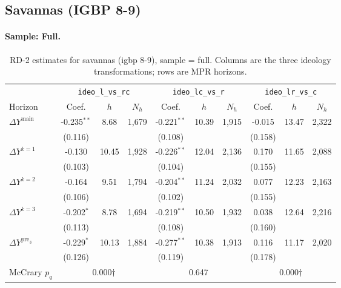 \documentclass[11pt]{article}
\begin{document}
\clearpage
\subsection{Savannas (IGBP 8-9)}
\paragraph{Sample: Full.}
\begin{table}[H]
\centering
\scriptsize
\caption{RD-2 estimates for savannas (igbp 8-9), sample = full.
Columns are the three ideology transformations; rows are MPR horizons.}
\label{tab:rd2_savannas_all}
\begin{tabular}{l ccc ccc ccc}
\toprule
 & \multicolumn{3}{c}{\texttt{ideo\_l\_vs\_rc}}
 & \multicolumn{3}{c}{\texttt{ideo\_lc\_vs\_r}}
 & \multicolumn{3}{c}{\texttt{ideo\_lr\_vs\_c}} \\
\cmidrule(lr){2-4} \cmidrule(lr){5-7} \cmidrule(lr){8-10}
Horizon & Coef. & $h$ & $N_h$ & Coef. & $h$ & $N_h$ & Coef. & $h$ & $N_h$ \\
\midrule
$\Delta Y^{\text{main}}$ & -0.235$^{**}$ & 8.68 & 1,679 & -0.221$^{**}$ & 10.39 & 1,915 & -0.015 & 13.47 & 2,322 \\
 & (0.116) &  &  & (0.108) &  &  & (0.158) &  &  \\
\addlinespace[1pt]
$\Delta Y^{k=1}$ & -0.130 & 10.45 & 1,928 & -0.226$^{**}$ & 12.04 & 2,136 & 0.170 & 11.65 & 2,088 \\
 & (0.103) &  &  & (0.104) &  &  & (0.155) &  &  \\
\addlinespace[1pt]
$\Delta Y^{k=2}$ & -0.164 & 9.51 & 1,794 & -0.204$^{**}$ & 11.24 & 2,032 & 0.077 & 12.23 & 2,163 \\
 & (0.106) &  &  & (0.102) &  &  & (0.155) &  &  \\
\addlinespace[1pt]
$\Delta Y^{k=3}$ & -0.202$^{*}$ & 8.78 & 1,694 & -0.219$^{**}$ & 10.50 & 1,932 & 0.038 & 12.64 & 2,216 \\
 & (0.113) &  &  & (0.108) &  &  & (0.160) &  &  \\
\addlinespace[1pt]
$\Delta Y^{\text{pre}_3}$ & -0.229$^{*}$ & 10.13 & 1,884 & -0.277$^{**}$ & 10.38 & 1,913 & 0.116 & 11.17 & 2,020 \\
 & (0.126) &  &  & (0.119) &  &  & (0.178) &  &  \\
\addlinespace[1pt]
\midrule
McCrary $p_q$ & \multicolumn{3}{c}{0.000$\dagger$} & \multicolumn{3}{c}{0.647} & \multicolumn{3}{c}{0.000$\dagger$} \\
\bottomrule
\end{tabular}
\end{table}
\end{document}
